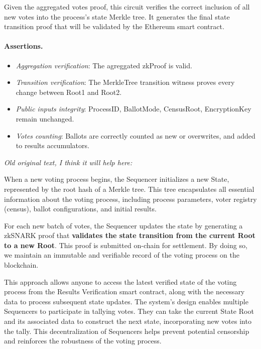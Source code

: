 \noi Given the aggregated votes proof, this circuit verifies the correct inclusion of all new votes into the process's state Merkle tree. It generates the final state transition proof that will be validated by the Ethereum smart contract.

\paragraph{Assertions.}

\begin{itemize}
	\item \emph{Aggregation verification}: The agreggated zkProof is valid.
	\item \emph{Transition verification}: The MerkleTree transition witness proves every change between Root1 and Root2.
	\item \emph{Public inputs integrity}: ProcessID, BallotMode, CensusRoot, EncryptionKey remain unchanged.
	\item \emph{Votes counting}: Ballots are correctly counted as new or overwrites, and added to results accumulators.
\end{itemize}


\noi \textit{Old original text, I think it will help here:}

When a new voting process begins, the Sequencer initializes a new State, represented by the root hash of a Merkle tree. This tree encapsulates all essential information about the voting process, including process parameters, voter registry (census), ballot configurations, and initial results.

For each new batch of votes, the Sequencer updates the state by generating a zkSNARK proof that \textbf{validates the state transition from the current Root to a new Root}. This proof is submitted on-chain for settlement. By doing so, we maintain an immutable and verifiable record of the voting process on the blockchain.

This approach allows anyone to access the latest verified state of the voting process from the Results Verification smart contract, along with the necessary data to process subsequent state updates. The system's design enables multiple Sequencers to participate in tallying votes. They can take the current State Root and its associated data to construct the next state, incorporating new votes into the tally. This decentralization of Sequencers helps prevent potential censorship and reinforces the robustness of the voting process.

